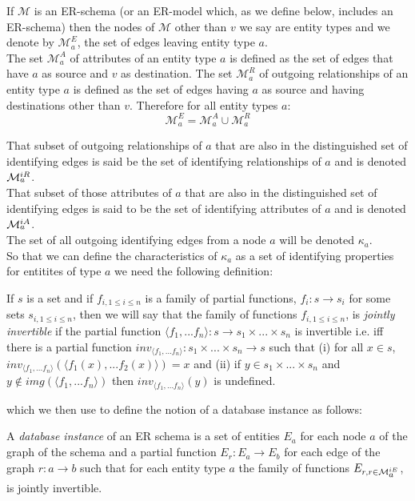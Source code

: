 \documentclass[10pt,a4paper]{article}
\newcommand{\term}[1]{\textit{{#1}}}
\newcommand{\genericmodel}{\mathcal{M}}
\newcommand{\allEdges}{\genericmodel^E}
\newcommand{\allAttrs}{\genericmodel^A}
\newcommand{\allRels}{\genericmodel^R}
\newcommand{\edges}[1]{\allEdges_{#1}}
\newcommand{\attrs}[1]{\allAttrs_{#1}}
\newcommand{\rels}[1]{\allRels_{#1}}
\newcommand{\allIdentifying}{\genericmodel^{iE}}
\newcommand{\allIdAttrs}{\genericmodel^{iA}}
\newcommand{\allIdRels}{\genericmodel^{iR}}
\newcommand{\idEdges}[1]{\allIdentifying_{\raisebox{2pt}{$\scriptstyle{#1}$}}}
\newcommand{\idAttrs}[1]{\allIdAttrs_{\raisebox{2pt}{$\scriptstyle{#1}$}}}
\newcommand{\idRels}[1]{\allIdRels_{\raisebox{2pt}{$\scriptstyle{#1}$}}}
\newcommand{\Vtype}{v}
\begin{document}
\noindent If $\genericmodel$ is an ER-schema (or an ER-model which, as we define below, 
includes an ER-schema) then the nodes of $\genericmodel$ other than $\Vtype$ we say are entity types and we denote by $\edges{a}$, the set of edges leaving entity type $a$. \\

\noindent
The set $\attrs{a}$ of attributes of an entity type $a$ is defined as the set of edges that have $a$ as source and  $\Vtype$ as destination. The set $\rels{a}$ of outgoing relationships of an entity type $a$ is defined as the set of edges having $a$ as source and having destinations other than $\Vtype$.
\noindent Therefore for all entity types $a$:
$$
\edges{a} = \attrs{a} \cup \rels{a}
$$

\noindent That subset of outgoing relationships of $a$ that are also in the distinguished set of identifying edges is said 
be the set of identifying relationships of $a$ and is  denoted $\idRels{a}$. \\

\noindent That subset of those attributes of $a$ that are also in the distinguished set of identifying edges is said 
to be the set of identifying attributes of $a$  and is denoted $\idAttrs{a}$.\\

\noindent The set of all outgoing identifying edges from a node $a$ will be denoted $\kappa_a$. \\

\noindent So that we can define the characteristics of $\kappa_a$ as a set of identifying properties for entitites of type
$a$ we need the following definition:

\begin{definition}
If $s$ is a set and if $f_{i, 1\leq i \leq n}$ is a family of partial functions, $f_i: s \rightarrow s_i$   for some sets $s_{i, 1 \leq i \leq n}$,  then
we will say that the family of functions $f_{i, 1\leq i \leq n}$, is \term{jointly invertible} if the partial function $\langle f_1,...f_n\rangle: s \rightarrow
s_1 \times ... \times s_n $ is invertible i.e. iff there is a partial function $inv_{\langle f_1,...f_n\rangle} : s_1 \times ... \times s_n \rightarrow s$ such that
(i) for all $x \in s$, $inv_{\langle f_1,...f_n\rangle}(\langle f_1(x),...f_2(x) \rangle ) = x$ and (ii) if $y \in s_1 \times ... \times s_n $ and
$y \notin img(\langle f_1,...f_n\rangle)$ then $inv_{\langle f_1,...f_n\rangle}(y)$ is undefined. \\
\end{definition}
\noindent which we then use to define the notion of a database instance as follows:
\begin{definition}
\noindent A \term{database instance}  of an ER schema is
a set of entities $E_a$ for each node $a$ of the graph of the schema and 
a partial function $E_r : E_a \rightarrow E_b$ for each edge of the graph $r:a \rightarrow b$ such that 
for each entity type $a$ the family of functions $E_{r, r \in \idEdges{a}}$, is jointly invertible. 
\end{definition}
\end{document}
